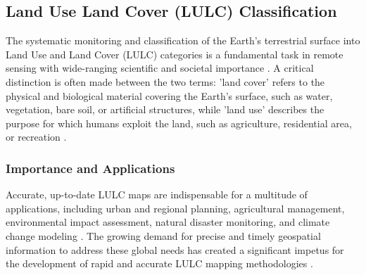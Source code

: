 \documentclass{report}
\begin{document}
\subsection{Land Use Land Cover (LULC) Classification}
The systematic monitoring and classification of the Earth's terrestrial surface into Land Use and Land Cover (LULC) categories is a fundamental task in remote sensing with wide-ranging scientific and societal importance \parencite[p.~2]{TalukdarEtAlLandUseLandCoverClassificationMachineLearningClassifiersSatelliteObservationsReview2020}. A critical distinction is often made between the two terms: 'land cover' refers to the physical and biological material covering the Earth's surface, such as water, vegetation, bare soil, or artificial structures, while 'land use' describes the purpose for which humans exploit the land, such as agriculture, residential area, or recreation \parencite[p.~1]{NeupaneEtAlDeepLearningBasedSemanticSegmentationUrbanFeaturesSatelliteImagesReviewMetaAnalysis2021}.
\subsubsection*{Importance and Applications}
 Accurate, up-to-date LULC maps are indispensable for a multitude of applications, including urban and regional planning, agricultural management, environmental impact assessment, natural disaster monitoring, and climate change modeling \parencites[p.~2;]{TalukdarEtAlLandUseLandCoverClassificationMachineLearningClassifiersSatelliteObservationsReview2020}[p.~309;]{KotaridisLazaridouRemotesensingimagesegmentationadvancesmetaanalysis2021a}[p.~2]{SertelEtAlLandUseLandCoverMappingUsingDeepLearningBasedSegmentationApproachesVHRWorldview3Images2022}. The growing demand for precise and timely geospatial information to address these global needs has created a significant impetus for the development of rapid and accurate LULC mapping methodologies \parencites[p.~309]{KotaridisLazaridouRemotesensingimagesegmentationadvancesmetaanalysis2021a}.
\end{document}
